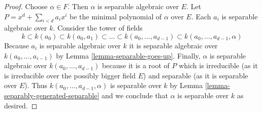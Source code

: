 \documentclass[10pt,a4paper]{amsart}
\theoremstyle{plain}
\theoremstyle{definition}
\theoremstyle{remark}
\numberwithin{equation}{subsection}
\begin{document}
\begin{proof}
Choose $\alpha \in F$. Then $\alpha$ is separable algebraic over $E$.
Let $P = x^d + \sum_{i < d} a_i x^i$ be the minimal polynomial of
$\alpha$ over $E$. Each $a_i$ is separable algebraic over $k$.
Consider the tower of fields
$$
k \subset k(a_0) \subset k(a_0, a_1) \subset \ldots \subset
k(a_0, \ldots, a_{d - 1}) \subset k(a_0, \ldots, a_{d - 1}, \alpha)
$$
Because $a_i$ is separable algebraic over $k$ it is separable algebraic
over $k(a_0, \ldots, a_{i - 1})$ by Lemma \ref{lemma-separable-goes-up}.
Finally, $\alpha$ is separable algebraic over $k(a_0, \ldots, a_{d - 1})$
because it is a root of $P$ which is irreducible
(as it is irreducible over the possibly bigger field $E$)
and separable (as it is separable over $E$).
Thus $k(a_0, \ldots, a_{d - 1}, \alpha)$ is separable over $k$
by Lemma \ref{lemma-separably-generated-separable}
and we conclude that $\alpha$ is separable over $k$ as desired.
\end{proof}
\end{document}
